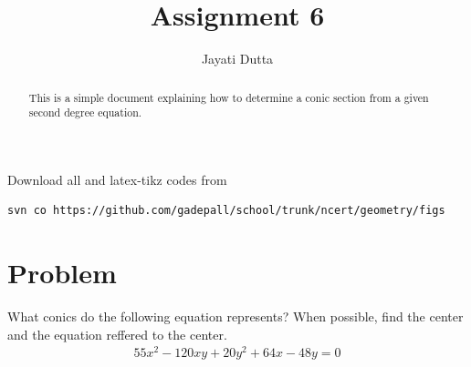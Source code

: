 \documentclass[journal,12pt,twocolumn]{IEEEtran}
\begin{document}
\let\StandardTheFigure\thefigure
\let\vec\mathbf
\renewcommand{\thefigure}{\theproblem}



\def\putbox#1#2#3{\makebox[0in][l]{\makebox[#1][l]{}\raisebox{\baselineskip}[0in][0in]{\raisebox{#2}[0in][0in]{#3}}}}
     \def\rightbox#1{\makebox[0in][r]{#1}}
     \def\centbox#1{\makebox[0in]{#1}}
     \def\topbox#1{\raisebox{-\baselineskip}[0in][0in]{#1}}
     \def\midbox#1{\raisebox{-0.5\baselineskip}[0in][0in]{#1}}

\vspace{3cm}


\title{Assignment 6}
\author{Jayati Dutta}





\maketitle

\newpage


\bigskip

\renewcommand{\thefigure}{\theenumi}
\renewcommand{\thetable}{\theenumi}


\begin{abstract}
This is a simple document explaining how to determine a conic section from a given second degree equation.
\end{abstract}

%

Download all and latex-tikz codes from 
%
\begin{lstlisting}
svn co https://github.com/gadepall/school/trunk/ncert/geometry/figs
\end{lstlisting}
%


\section{Problem}
What conics do the following equation represents? When possible, find the center and the equation reffered to the center.
\begin{multline}
55x^2 - 120xy + 20y^2 +64x -48y=0
\label{eqn1}
\end{multline}
\end{document}
